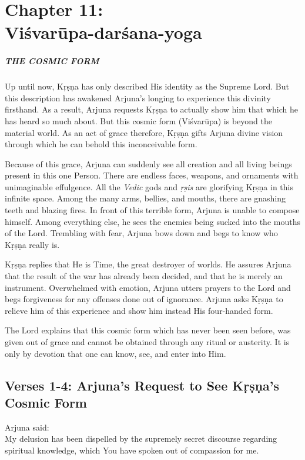 \chapter{Chapter 11: \\Viśvarūpa-darśana-yoga}\label{chap-visvarupa-darsana-yoga}

\paragraph*{\MakeUppercase{The Cosmic Form}}

\noindent Up until now, Kṛṣṇa has only described His identity as the Supreme Lord. But this description has awakened Arjuna’s longing to experience this divinity firsthand. As a result, Arjuna requests Kṛṣṇa to actually show him that which he has heard so much about. But this cosmic form (Viśvarūpa) is beyond the material world. As an act of grace therefore, Kṛṣṇa gifts Arjuna divine vision through which he can behold this inconceivable form.

Because of this grace, Arjuna can suddenly see all creation and all living beings present in this one Person. There are endless faces, weapons, and ornaments with unimaginable effulgence. All the \textit{Vedic} gods and \textit{ṛṣis} are glorifying Kṛṣṇa in this infinite space. Among the many arms, bellies, and mouths, there are gnashing teeth and blazing fires. In front of this terrible form, Arjuna is unable to compose himself. Among everything else, he sees the enemies being sucked into the mouths of the Lord. Trembling with fear, Arjuna bows down and begs to know who Kṛṣṇa really is.

Kṛṣṇa replies that He is Time, the great destroyer of worlds. He assures Arjuna that the result of the war has already been decided, and that he is merely an instrument. Overwhelmed with emotion, Arjuna utters prayers to the Lord and begs forgiveness for any offenses done out of ignorance. Arjuna asks Kṛṣṇa to relieve him of this experience and show him instead His four-handed form.

The Lord explains that this cosmic form which has never been seen before, was given out of grace and cannot be obtained through any ritual or austerity. It is only by devotion that one can know, see, and enter into Him.


\section{Verses 1-4: Arjuna's Request to See Kṛṣṇa's Cosmic Form}\label{sec-verses-1-4-arjuna-s-request-to-see-krsna-s-cosmic-form}
{\hspace*{1em}Arjuna said: \\
My delusion has been dispelled by the supremely secret discourse regarding spiritual knowledge, which You have spoken out of compassion for me.}

